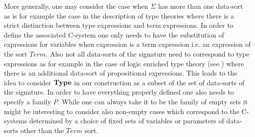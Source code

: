 \documentclass[11pt]{article}
\newenvironment{proof}{{\bf Proof}:}{\vskip 5mm }
\newtheorem{lemma}[proposition]{Lemma}
\newcommand{\llabel}[1]{\label{#1}[{\bf #1}]}
\newcommand{\comment}[1]{}
\newcommand{\sr}{\rightarrow}
\newcommand{\bind}{bind}
\begin{document}
{{More generally, one may consider the case when $\Sigma$ has more than one data-sort as is for example the case in the description of type theories where there is a strict distinction between type expressions and term expressions. In order to define the associated C-system one only needs to have the substitution of expressions for variables when expression is a term expression i.e. an expression of the sort $Term$. Also not all data-sorts of the signature need to correspond to type expressions as for example in the case of logic enriched type theory (see \cite{AczelGambino}) where there is an additional data-sort of propositional expressions. This leads to the idea to consider $\bf Type$ in our construction as a subset of the set of data-sorts of the signature. In order to have everything properly defined one also needs to specify a family $P$. While one can always take it to be the family of empty sets it might be interesting to consider also non-empty cases which correspond to the C-systems determined by a choice of fixed sets of variables or parameters of data-sorts other than the $Term$ sort. 

}

}



\comment{

\begin{lemma}
\llabel{2014.07.28.l2}
Let $R$ be a monad on the product category ${\cal C}\times {\cal D}$. Let $A\in {\cal D}$. Then the functor $R_{A,1}:X\mapsto pr_{\cal C}(R(X,A))$ has a natural structure of a monad on $\cal C$.
\end{lemma}
%
\begin{proof}
One defines the morphisms $\eta_X:X\sr R_{A,1}(X)$ by
%
$$\eta_X := pr_{\cal C}(\eta_{(X,A)})$$
%
and morphisms $ \bind(f):R_{A,1}(X)\sr R_{A,1}(X')$ for $f:X\sr R_{A,1}(X')$ by
%
$$ \bind(f) := pr_{\cal C}( \bind(f,pr_{\cal D}(\eta_{(X,A)})))$$
%
The verification of the conditions of Lemma \ref{2014.06.30.l1} is straightforward. 
\end{proof}
% 

}
\end{document}
